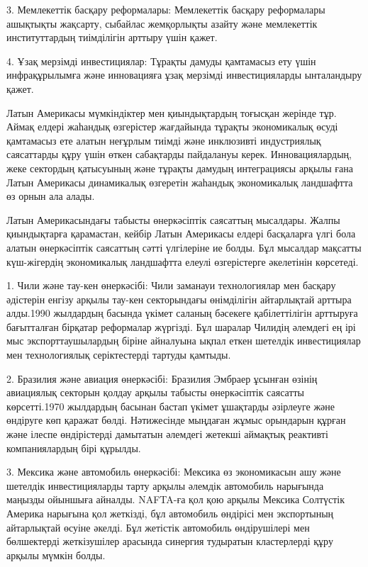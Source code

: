 \begin{multicols}{2}
3. Мемлекеттік басқару реформалары: Мемлекеттік басқару реформалары
ашықтықты жақсарту, сыбайлас жемқорлықты азайту және мемлекеттік
институттардың тиімділігін арттыру үшін қажет.

4. Ұзақ мерзімді инвестициялар: Тұрақты дамуды қамтамасыз ету үшін
инфрақұрылымға және инновацияға ұзақ мерзімді инвестицияларды
ынталандыру қажет.

Латын Америкасы мүмкіндіктер мен қиындықтардың тоғысқан жерінде тұр.
Аймақ елдері жаһандық өзгерістер жағдайында тұрақты экономикалық өсуді
қамтамасыз ете алатын неғұрлым тиімді және инклюзивті индустриялық
саясаттарды құру үшін өткен сабақтарды пайдалануы керек.
Инновациялардың, жеке сектордың қатысуының және тұрақты дамудың
интеграциясы арқылы ғана Латын Америкасы динамикалық өзгеретін жаһандық
экономикалық ландшафтта өз орнын ала алады.

Латын Америкасындағы табысты өнеркәсіптік саясаттың мысалдары. Жалпы
қиындықтарға қарамастан, кейбір Латын Америкасы елдері басқаларға үлгі
бола алатын өнеркәсіптік саясаттың сәтті үлгілеріне ие болды. Бұл
мысалдар мақсатты күш-жігердің экономикалық ландшафтта елеулі
өзгерістерге әкелетінін көрсетеді.

1. Чили және тау-кен өнеркәсібі: Чили заманауи технологиялар мен басқару
әдістерін енгізу арқылы тау-кен секторындағы өнімділігін айтарлықтай
арттыра алды.1990 жылдардың басында үкімет саланың бәсекеге
қабілеттілігін арттыруға бағытталған бірқатар реформалар жүргізді. Бұл
шаралар Чилидің әлемдегі ең ірі мыс экспорттаушылардың біріне айналуына
ықпал еткен шетелдік инвестициялар мен технологиялық серіктестерді
тартуды қамтыды.

2. Бразилия және авиация өнеркәсібі: Бразилия Эмбраер ұсынған өзінің
авиациялық секторын қолдау арқылы табысты өнеркәсіптік саясатты
көрсетті.1970 жылдардың басынан бастап үкімет ұшақтарды әзірлеуге және
өндіруге көп қаражат бөлді. Нәтижесінде мыңдаған жұмыс орындарын құрған
және ілеспе өндірістерді дамытатын әлемдегі жетекші аймақтық реактивті
компаниялардың бірі құрылды.

3. Мексика және автомобиль өнеркәсібі: Мексика өз экономикасын ашу және
шетелдік инвестицияларды тарту арқылы әлемдік автомобиль нарығында
маңызды ойыншыға айналды. NAFTA-ға қол қою арқылы Мексика Солтүстік
Америка нарығына қол жеткізді, бұл автомобиль өндірісі мен экспортының
айтарлықтай өсуіне әкелді. Бұл жетістік автомобиль өндірушілері мен
бөлшектерді жеткізушілер арасында синергия тудыратын кластерлерді құру
арқылы мүмкін болды.


\end{multicols}

